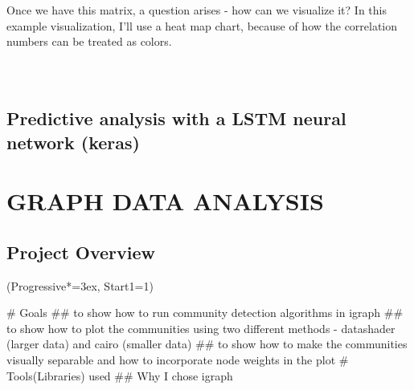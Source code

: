 \documentclass[12pt, a4paper]{article}
\let\OldEasylist\easylist
\let\OldEndEasylist\endeasylist
\renewenvironment{easylist}{%
    \OldEasylist%
    \ListProperties(Progressive*=3ex, Start1=1)%
}{%
    \OldEndEasylist%
}%
\begin{document}
Once we have this matrix, a question arises - how can we visualize it? In this example visualization, I'll use a heat map chart, because of how the correlation numbers can be treated as colors.

\bgroup
  \inputminted[linenos, breaklines=true, fontsize=\scriptsize]{python}{src/stocks/corr/1_get_data.py}
  \label{listing:scorr_1}
\egroup


\bgroup
  \inputminted[linenos, breaklines=true, fontsize=\scriptsize, firstnumber=last]{python}{src/stocks/corr/2_problem_labels.py}
  \label{listing:scorr_2}
\egroup

\bgroup
  \inputminted[linenos, breaklines=true, fontsize=\scriptsize, firstnumber=last]{python}{src/stocks/corr/3_fix.py}
  \label{listing:scorr_3}
\egroup

\newpage
\subsection{Predictive analysis with a LSTM neural network (keras)}



\newpage
\section{GRAPH DATA ANALYSIS}
\subsection{Project Overview}
\begin{easylist}
# Goals
## to show how to run community detection algorithms in igraph
## to show how to plot the communities using two different methods - datashader  (larger data) and cairo (smaller data)
## to show how to make the communities visually separable and how to incorporate node weights in the plot
# Tools(Libraries) used
## Why I chose igraph
\end{easylist}
\end{document}
